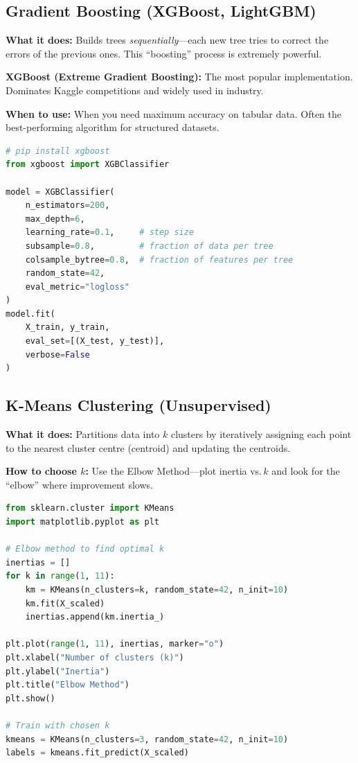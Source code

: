 \documentclass[12pt, a4paper, oneside]{book}
\begin{document}
\subsection{Gradient Boosting (XGBoost, LightGBM)}

\textbf{What it does:} Builds trees \emph{sequentially}---each new tree tries to correct the errors of the previous ones. This ``boosting'' process is extremely powerful.

\textbf{XGBoost (Extreme Gradient Boosting):} The most popular implementation. Dominates Kaggle competitions and widely used in industry.

\textbf{When to use:} When you need maximum accuracy on tabular data. Often the best-performing algorithm for structured datasets.

\begin{lstlisting}[language=Python, caption={XGBoost classifier}]
# pip install xgboost
from xgboost import XGBClassifier

model = XGBClassifier(
    n_estimators=200,
    max_depth=6,
    learning_rate=0.1,     # step size
    subsample=0.8,         # fraction of data per tree
    colsample_bytree=0.8,  # fraction of features per tree
    random_state=42,
    eval_metric="logloss"
)
model.fit(
    X_train, y_train,
    eval_set=[(X_test, y_test)],
    verbose=False
)
\end{lstlisting}

\subsection{K-Means Clustering (Unsupervised)}

\textbf{What it does:} Partitions data into $k$ clusters by iteratively assigning each point to the nearest cluster centre (centroid) and updating the centroids.

\textbf{How to choose $k$:} Use the Elbow Method---plot inertia vs.\,$k$ and look for the ``elbow'' where improvement slows.

\begin{lstlisting}[language=Python, caption={K-Means clustering with elbow method}]
from sklearn.cluster import KMeans
import matplotlib.pyplot as plt

# Elbow method to find optimal k
inertias = []
for k in range(1, 11):
    km = KMeans(n_clusters=k, random_state=42, n_init=10)
    km.fit(X_scaled)
    inertias.append(km.inertia_)

plt.plot(range(1, 11), inertias, marker="o")
plt.xlabel("Number of clusters (k)")
plt.ylabel("Inertia")
plt.title("Elbow Method")
plt.show()

# Train with chosen k
kmeans = KMeans(n_clusters=3, random_state=42, n_init=10)
labels = kmeans.fit_predict(X_scaled)
\end{lstlisting}
\end{document}

